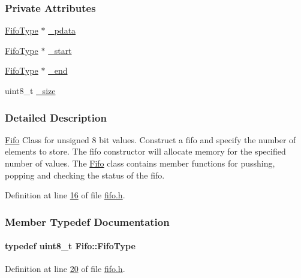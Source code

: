 \subsubsection*{Private Attributes}
\begin{DoxyCompactItemize}
\item 
\hyperlink{class_fifo_abc2a9e471beb538424db9e33955ec5f7}{FifoType} $\ast$ \hyperlink{class_fifo_adb3c9f91291d0af42197c7b30a718506}{\_\-pdata}
\item 
\hyperlink{class_fifo_abc2a9e471beb538424db9e33955ec5f7}{FifoType} $\ast$ \hyperlink{class_fifo_a440e9cfd5fd73a4f571a4027ff74d8d2}{\_\-start}
\item 
\hyperlink{class_fifo_abc2a9e471beb538424db9e33955ec5f7}{FifoType} $\ast$ \hyperlink{class_fifo_a5dea8e3ee360dd0555d25f1a57938a8f}{\_\-end}
\item 
uint8\_\-t \hyperlink{class_fifo_a0eb7824d54929e385223ef2e32c45c91}{\_\-size}
\end{DoxyCompactItemize}


\subsubsection{Detailed Description}
\hyperlink{class_fifo}{Fifo} Class for unsigned 8 bit values. Construct a fifo and specify the number of elements to store. The fifo constructor will allocate memory for the specified number of values. The \hyperlink{class_fifo}{Fifo} class contains member functions for pusshing, popping and checking the status of the fifo. 

Definition at line \hyperlink{fifo_8h_source_l00016}{16} of file \hyperlink{fifo_8h_source}{fifo.h}.



\subsubsection{Member Typedef Documentation}
\hypertarget{class_fifo_abc2a9e471beb538424db9e33955ec5f7}{
\paragraph[{FifoType}]{\setlength{\rightskip}{0pt plus 5cm}typedef uint8\_\-t {\bf Fifo::FifoType}}\hfill}
\label{class_fifo_abc2a9e471beb538424db9e33955ec5f7}


Definition at line \hyperlink{fifo_8h_source_l00020}{20} of file \hyperlink{fifo_8h_source}{fifo.h}.



